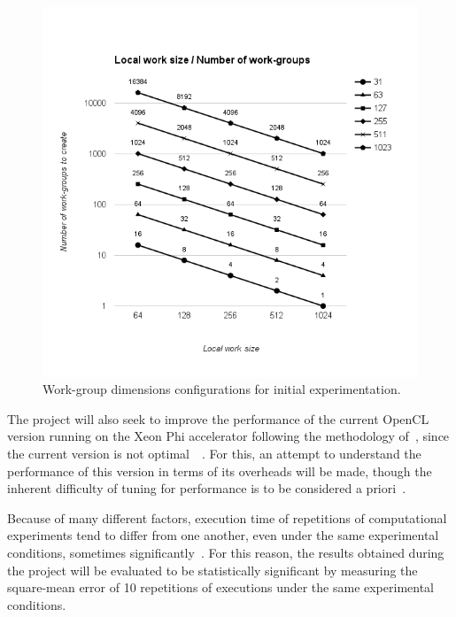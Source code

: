 \begin{figure}[!h]
\begin{center}
\centerline{\includegraphics[width=5.2in]{img/wgplot}}
\caption{Work-group dimensions configurations for initial experimentation.}
\label{f:wgplot}
\end{center}
\end{figure}

The project will also seek to improve the performance of the current OpenCL version running on the Xeon Phi accelerator following the methodology of~\cite{7_software.intel.com_2014}, since the current version is not optimal~\cite{Cheng2014}~\cite{7_farber_2012}. For this, an attempt to understand the performance of this version in terms of its overheads will be made, though the inherent difficulty of tuning for performance is to be considered a priori~\cite{riley1997performance}.


Because of many different factors, execution time of repetitions of computational experiments tend to differ from one another, even under the same experimental conditions, sometimes significantly~\cite{nogueira2014experimental}. For this reason, the results obtained during the project will be evaluated to be statistically significant by measuring the square-mean error of 10 repetitions of executions under the same experimental conditions.

